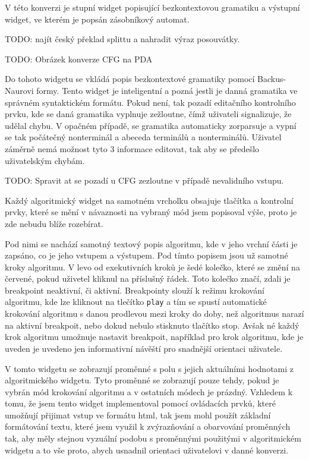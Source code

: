 V této konverzi je stupní widget popisující bezkontextovou gramatiku a výstupní widget, ve kterém je popsán zásobníkový automat.

TODO: najít český překlad splittu a nahradit výraz posouvátky.

TODO: Obrázek konverze CFG na PDA


Do tohoto widgetu se vkládá popis bezkontextové gramatiky pomocí Backus-Naurovi formy. Tento widget je inteligentní a pozná jestli je danná gramatika ve správném syntaktickém formátu. Pokud není, tak pozadí editačního kontrolního prvku, kde se daná gramatika vyplnuje zežloutne, čímž uživateli signalizuje, že udělal chybu. V opačném případě, se gramatika automaticky zorparsuje a vypní se tak počátečný nonterminál a abeceda terminálů a nonterminálů. Uživatel záměrně nemá možnost tyto 3 informace editovat, tak aby se předešlo uživatelským chybám.

TODO: Spravit at se pozadí u CFG zezloutne v případě nevalidního vstupu.


Každý algoritmický widget na samotném vrcholku obsajuje tlačítka a kontrolní prvky, které se mění v návaznosti na vybraný mód jsem popisoval výše, proto je zde nebudu blíže rozebírat.

Pod nimi se nachází samotný textový popis algoritmu, kde v jeho vrchní části je zapsáno, co je jeho vstupem a výstupem. Pod tímto popisem jsou už samotné kroky algoritmu. V levo od exekutivních kroků je šedé kolečko, které se změní na červené, pokud uživetel kliknul na příslušný řádek. Toto kolečko značí, zdali je breakpoint neaktivní, či aktivní. Breakpointy slouží k režimu krokování algoritmu, kde lze kliknout na tlečítko \texttt{play} a tím se spustí automatické krokování algoritmu s danou prodlevou mezi kroky do doby, než algoritmus narazí na aktivní breakpoit, nebo dokud nebulo stisknuto tlačítko stop. Avšak né každý krok algoritmu umožnuje nastavit breakpoit, například pro krok algoritmu, kde je uveden je uvedeno jen informativní návěští pro snadnější orientaci uživatele. 



V tomto widgetu se zobrazují proměnné s polu s jejich  aktuálními hodnotami z algoritmického widgetu. Tyto proměnné se zobrazují pouze tehdy, pokud je vybrán mód krokování algoritmu a v ostatních módech je prázdný. Vzhledem k tomu, že jsem tento widget implementoval pomocí ovládacích prvků, které umožňují přijimat vstup ve formátu html, tak jsem mohl použít základní formátování textu, které jsem využil k zvýrazňování a obarvování proměnných tak, aby měly stejnou vyzuální podobu s proměnnými použitými v algoritmickém widgetu a to vše proto, abych usnadnil orientaci uživatelovi v danné konverzi.

